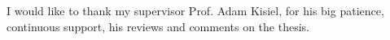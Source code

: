 \begin{center}
I would like to thank my supervisor Prof. Adam Kisiel, for his big patience, continuous support, his reviews and comments on the thesis.
\end{center}